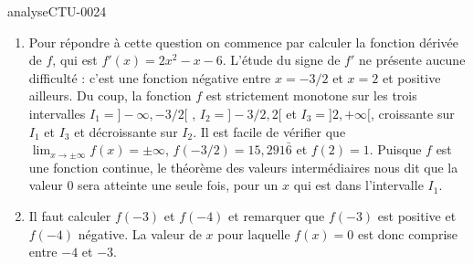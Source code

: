 
\begin{corrige}{analyseCTU-0024}

\begin{enumerate}
\item Pour répondre à cette question on commence par calculer la fonction dérivée de $f$, qui est $f'(x) = 2x^2 -x -6$. L'étude du signe de $f'$ ne présente aucune difficulté : c'est une fonction négative entre $x=-3/2$ et $x=2$ et positive ailleurs. Du coup, la fonction $f$ est strictement monotone sur les trois intervalles $I_1= ]-\infty, -3/2[$ , $I_2 =]-3/2, 2[ $ et $I_3 = ]2, +\infty[$, croissante sur $I_1$ et $I_3$ et décroissante sur $I_2$. Il est facile de vérifier que $\lim_{x\to\pm\infty}f(x) = \pm\infty$, $f(-3/2) = 15,291\bar 6$ et $f(2) = 1$. Puisque $f$ est une fonction continue, le théorème des valeurs intermédiaires nous dit que la valeur $0$ sera atteinte une seule fois, pour un $x$ qui est dans l'intervalle $I_1$.
\item Il faut calculer $f(-3) $ et $f(-4)$ et remarquer que $f(-3)$ est positive et $f(-4)$ négative. La valeur de $x$ pour laquelle $f(x) = 0$ est donc comprise entre $-4$ et $-3$.
\end{enumerate}


\end{corrige}
